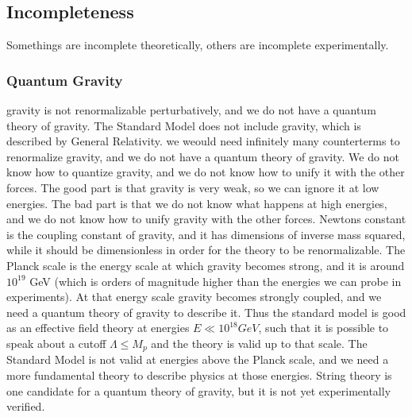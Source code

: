 \subsection{Incompleteness}

Somethings are incomplete theoretically, others are incomplete experimentally.

\subsubsection{Quantum Gravity}

gravity is not renormalizable perturbatively, and we do not have a quantum theory of gravity. The Standard Model does not include gravity, which is described by General Relativity. we weould need infinitely many counterterms to renormalize gravity, and we do not have a quantum theory of gravity. We do not know how to quantize gravity, and we do not know how to unify it with the other forces. The good part is that gravity is very weak, so we can ignore it at low energies. The bad part is that we do not know what happens at high energies, and we do not know how to unify gravity with the other forces. Newtons constant is the coupling constant of gravity, and it has dimensions of inverse mass squared, while it should be dimensionless in order for the theory to be renormalizable. The Planck scale is the energy scale at which gravity becomes strong, and it is around \(10^{19}\) GeV (which is orders of magnitude higher than the energies we can probe in experiments). At that energy scale gravity becomes strongly coupled, and we need a quantum theory of gravity to describe it. Thus the standard model is good as an effective field theory at energies \(E \ll 10^{18} GeV\), such that it is possible to speak about a cutoff \(\Lambda \leq M_p\) and the theory is valid up to that scale. The Standard Model is not valid at energies above the Planck scale, and we need a more fundamental theory to describe physics at those energies. String theory is one candidate for a quantum theory of gravity, but it is not yet experimentally verified.

